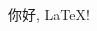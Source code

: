 \documentclass{article}
\begin{document}
\begin{CJK}{UTF8}{gkai}%

你好, LaTeX!

\end{CJK}
\end{document}
